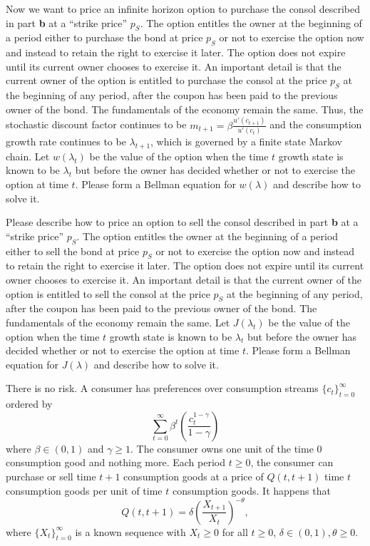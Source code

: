   \quad
Now we want to price an infinite horizon  option to purchase the  consol described in part {\bf b}  at a ``strike price'' $p_S$.
The option entitles the owner at the beginning of a period either to purchase the bond at price $p_S$ or not to exercise the option
now and instead to retain the right to exercise it later. The option does not expire until its current  owner chooses to exercise it. An important detail is that
the current owner of the option is entitled to purchase the consol at the price  $p_S$ at the beginning of any period, after the coupon has been paid
to the previous owner of the bond.
The fundamentals of the economy remain the same.  Thus, the stochastic discount factor continues to be $m_{t+1} = \beta
{\frac{u'(c_{t+1})}{u'(c_t)}}$ and the consumption growth rate continues to be $\lambda_{t+1}$, which
is governed by a finite state Markov chain.
Let $w(\lambda_t)$ be the value of the option when the time $t$ growth state is known to be $\lambda_t$ but before
the owner has decided whether or not to exercise the option
at time $t$.  Please form a Bellman equation for $w(\lambda)$ and describe how to solve it.


\medskip

  \quad Please describe how to price an option to sell the  consol described in part {\bf b}  at a ``strike price'' $p_S$.
The option entitles the owner at the beginning of a period either to sell the bond at price $p_S$ or not to exercise the option
now and instead to retain the right to exercise it later. The option does not expire until its current  owner chooses to exercise it. An important detail is that
the current owner of the option is entitled to sell the consol at the price  $p_S$ at the beginning of any period, after the coupon has been paid
to the previous owner of the bond. The fundamentals of the economy remain the same. Let $J(\lambda_t)$ be the value of the option when the time $t$ growth state is known to be $\lambda_t$ but before
the owner has decided whether or not to exercise the option
at time $t$.  Please form a Bellman equation for $J(\lambda)$ and describe how to solve it.


\medskip
{}  
\medskip

\noindent There is no risk.
A consumer has preferences over consumption streams $\{c_t\}_{t=0}^\infty$ ordered by
$$ \sum_{t=0}^\infty \beta^t \left({\frac{c_t^{1-\gamma}}{1 - \gamma}} \right)$$
where $\beta \in (0,1)$ and $\gamma \geq 1$.  The consumer owns one unit of the time $0$ consumption good and nothing more.
Each period $t \geq 0$, the consumer can purchase or sell time $t+1$ consumption goods at a price of $Q(t, t+1)$ time $t$ consumption goods
per unit of time $t$ consumption goods.  It happens that
$$ Q(t,t+1) = \delta \left( {\frac{X_{t+1}}{X_t}}  \right)^{-\theta} , $$
where $\{X_t\}_{t=0}^\infty$ is a known sequence with $X_t \geq 0$ for all $t \geq 0$, $\delta \in (0,1), \theta \geq 0$.

